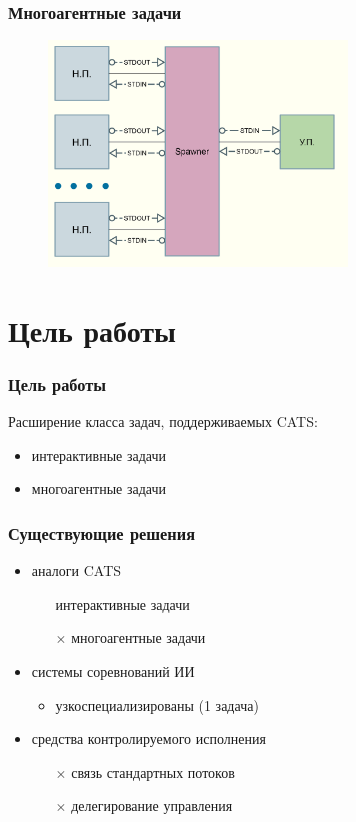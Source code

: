 \documentclass{beamer}
\begin{document}
\begin{frame}
  \frametitle{Многоагентные задачи}
  \begin{figure}[htb]
  \centering
  \includegraphics[height=6cm,keepaspectratio]{./img/multiagent_data_flow.png}
  \end{figure}
\end{frame}

\section{Цель работы}

\begin{frame}
  \frametitle{Цель работы}
  Расширение класса задач, поддерживаемых CATS:
  \begin{itemize}
  \item интерактивные задачи
  \item многоагентные задачи
  \end{itemize}
\end{frame}

\begin{frame}
  \frametitle{Существующие решения}
  \begin{itemize}
  \item аналоги CATS
    \begin{itemize}
    \item[\checkmark] интерактивные задачи
    \item[$\times$] многоагентные задачи
    \end{itemize}
  \item системы соревнований ИИ
    \begin{itemize}
    \item узкоспециализированы (1 задача)
    \end{itemize}
  \item средства контролируемого исполнения
    \begin{itemize}
    \item[$\times$] связь стандартных потоков
    \item[$\times$] делегирование управления
    \end{itemize}
  \end{itemize}
\end{frame}
\end{document}
